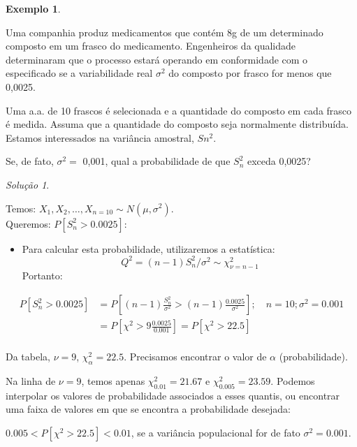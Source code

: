 \documentclass[
]{book}
\providecommand{\tightlist}{%
  \setlength{\itemsep}{0pt}\setlength{\parskip}{0pt}}
\theoremstyle{definition}
\theoremstyle{definition}
\newtheorem{example}{Exemplo}[chapter]
\theoremstyle{definition}
\theoremstyle{remark}
\newtheorem*{solution}{Solução}
\begin{document}
\begin{example}
\protect\hypertarget{exm:unnamed-chunk-27}{}{\label{exm:unnamed-chunk-27} }
\end{example}

Uma companhia produz medicamentos que contém 8g de um determinado composto em um frasco do medicamento. Engenheiros da qualidade determinaram que o processo estará operando em conformidade com o especificado se a variabilidade real \(\sigma^2\) do composto por frasco for menos que 0,0025.

Uma a.a. de 10 frascos é selecionada e a quantidade do composto em cada frasco é medida.
Assuma que a quantidade do composto seja normalmente distribuída.
Estamos interessados na variância amostral, \(Sn^2\).

Se, de fato, \(\sigma^2 =\) 0,001, qual a probabilidade de que \(S_n^2\) exceda 0,0025?

\begin{solution}
{}
\end{solution}

Temos: \(X_1, X_2, \ldots, X_{n=10} \sim N(\mu, \sigma^2)\).\\
Queremos: \(P[S_n^2 > 0.0025]\):

\begin{itemize}
\tightlist
\item
  Para calcular esta probabilidade, utilizaremos a estatística:
  \[Q^2 = (n-1) S_n^2/\sigma^2 \sim \chi^2_{\nu = n-1}\]
  Portanto:
\end{itemize}

\begin{align*}
  P[S_n^2 > 0.0025]
  &= P\left[(n-1)\frac{S_n^2}{\sigma^2} > (n-1)\frac{0.0025}{\sigma^2}\right]; \quad n = 10; \sigma^2 = 0.001\\
  &= P\left[\chi^2 > 9 \frac{0.0025}{0.001}\right] = P[\chi^2 > 22.5]\\
\end{align*}

Da tabela, \(\nu=9\), \(\chi^2_\alpha = 22.5\). Precisamos encontrar o valor de \(\alpha\) (probabilidade).

Na linha de \(\nu =9\), temos apenas \(\chi^2_{0.01} = 21.67\) e \(\chi^2_{0.005} = 23.59\).
Podemos interpolar os valores de probabilidade associados a esses quantis, ou encontrar uma faixa de valores em que se encontra a probabilidade desejada:

\(0.005 < P[\chi^2 > 22.5] < 0.01\), se a variância populacional for de fato \(\sigma^2 = 0.001\).
\end{document}
